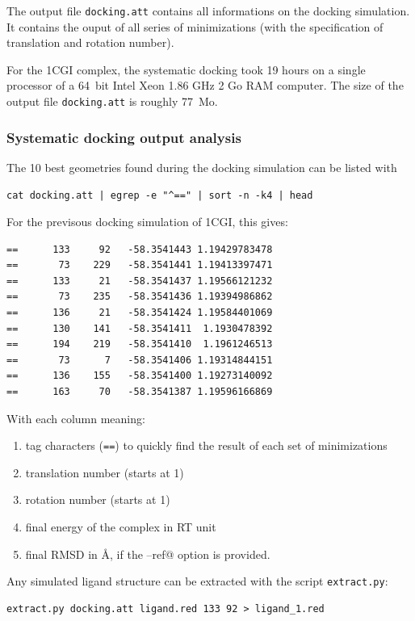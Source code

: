\documentclass[12pt,a4paper]{article}
\begin{document}
The output file {\tt docking.att} contains all informations on the docking simulation. It contains the ouput of all series of minimizations (with the specification of translation and rotation number).

For the 1CGI complex, the systematic docking took 19 hours on a single processor of a 64~bit Intel Xeon 1.86 GHz 2 Go RAM computer.
The size of the output file {\tt docking.att} is roughly 77~Mo.

\subsubsection{Systematic docking output analysis}
The 10 best geometries found during the docking simulation can be listed with

\begin{verbatim}
cat docking.att | egrep -e "^==" | sort -n -k4 | head
\end{verbatim}

For the previsous docking simulation of 1CGI, this gives:

\begin{verbatim}
==      133     92   -58.3541443 1.19429783478
==       73    229   -58.3541441 1.19413397471
==      133     21   -58.3541437 1.19566121232
==       73    235   -58.3541436 1.19394986862
==      136     21   -58.3541424 1.19584401069
==      130    141   -58.3541411  1.1930478392
==      194    219   -58.3541410  1.1961246513
==       73      7   -58.3541406 1.19314844151
==      136    155   -58.3541400 1.19273140092
==      163     70   -58.3541387 1.19596166869
\end{verbatim}

With each column meaning:
\begin{enumerate}
\item tag characters ({\tt ==}) to quickly find the result of each set of minimizations
\item translation number (starts at 1)
\item rotation number (starts at 1)
\item final energy of the complex in RT unit
\item final RMSD in \AA, if the \verb@--ref@ option is provided.
\end{enumerate}

Any simulated ligand structure can be extracted with the script {\tt extract.py}:

\begin{verbatim}
extract.py docking.att ligand.red 133 92 > ligand_1.red
\end{verbatim}
\end{document}
